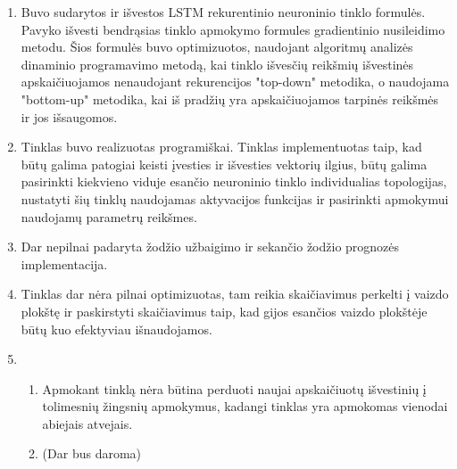 \begin{enumerate}
  \item Buvo sudarytos ir išvestos LSTM rekurentinio neuroninio tinklo formulės. Pavyko išvesti bendrąsias tinklo apmokymo formules gradientinio nusileidimo metodu. Šios formulės buvo optimizuotos, naudojant algoritmų analizės dinaminio programavimo metodą, kai tinklo išvesčių reikšmių išvestinės apskaičiuojamos nenaudojant rekurencijos "top-down" metodika, o naudojama "bottom-up" metodika, kai iš pradžių yra apskaičiuojamos tarpinės reikšmės ir jos išsaugomos.
  \item Tinklas buvo realizuotas programiškai. Tinklas implementuotas taip, kad būtų galima patogiai keisti įvesties ir išvesties vektorių ilgius, būtų galima pasirinkti kiekvieno viduje esančio neuroninio tinklo individualias topologijas, nustatyti šių tinklų naudojamas aktyvacijos funkcijas ir pasirinkti apmokymui naudojamų parametrų reikšmes.
  \item Dar nepilnai padaryta žodžio užbaigimo ir sekančio žodžio prognozės implementacija.
  \item Tinklas dar nėra pilnai optimizuotas, tam reikia skaičiavimus perkelti į vaizdo plokštę ir paskirstyti skaičiavimus taip, kad gijos esančios vaizdo plokštėje būtų kuo efektyviau išnaudojamos.
  \item
  \begin{enumerate}
    \item Apmokant tinklą nėra būtina perduoti naujai apskaičiuotų išvestinių į tolimesnių žingsnių apmokymus, kadangi tinklas yra apmokomas vienodai abiejais atvejais.
    \item (Dar bus daroma)
  \end{enumerate}
\end{enumerate}

